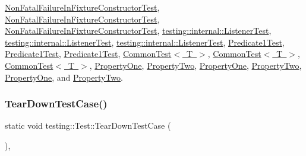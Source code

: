 \mbox{\hyperlink{class_non_fatal_failure_in_fixture_constructor_test_ab76d79c346d9a378d625fde5739e8ad6}{Non\+Fatal\+Failure\+In\+Fixture\+Constructor\+Test}}, \mbox{\hyperlink{class_non_fatal_failure_in_fixture_constructor_test_ad5d87bdc012dc66c008e7891008eb6a8}{Non\+Fatal\+Failure\+In\+Fixture\+Constructor\+Test}}, \mbox{\hyperlink{class_non_fatal_failure_in_fixture_constructor_test_ad5d87bdc012dc66c008e7891008eb6a8}{Non\+Fatal\+Failure\+In\+Fixture\+Constructor\+Test}}, \mbox{\hyperlink{classtesting_1_1internal_1_1_listener_test_a733f61300772e432a6a3ec7837c9f331}{testing\+::internal\+::\+Listener\+Test}}, \mbox{\hyperlink{classtesting_1_1internal_1_1_listener_test_a733f61300772e432a6a3ec7837c9f331}{testing\+::internal\+::\+Listener\+Test}}, \mbox{\hyperlink{classtesting_1_1internal_1_1_listener_test_ad112535025d668e3ea14e71d8741c810}{testing\+::internal\+::\+Listener\+Test}}, \mbox{\hyperlink{class_predicate1_test_aacedc6281afabd551ae2e67777016f3d}{Predicate1\+Test}}, \mbox{\hyperlink{class_predicate1_test_aacedc6281afabd551ae2e67777016f3d}{Predicate1\+Test}}, \mbox{\hyperlink{class_predicate1_test_ad2974af5c6abc508847c3a9912b24a90}{Predicate1\+Test}}, \mbox{\hyperlink{class_common_test_a5e851b64ff1f73cb79b4dbd1d39fd075}{Common\+Test$<$ T $>$}}, \mbox{\hyperlink{class_common_test_a5e851b64ff1f73cb79b4dbd1d39fd075}{Common\+Test$<$ T $>$}}, \mbox{\hyperlink{class_common_test_aeae195c2cefa956c6ae5be1226e6ecd8}{Common\+Test$<$ T $>$}}, \mbox{\hyperlink{class_property_one_a3ed895113848403d5ea27f52a1bb0545}{Property\+One}}, \mbox{\hyperlink{class_property_two_aa4ffb2b9dddeba69f0f9baf133f06ef2}{Property\+Two}}, \mbox{\hyperlink{class_property_one_a0a9a054682c28e32d6b3007e966a1aaf}{Property\+One}}, \mbox{\hyperlink{class_property_two_a8c2b36ef29249c5654f13bf8f504236a}{Property\+Two}}, \mbox{\hyperlink{class_property_one_a0a9a054682c28e32d6b3007e966a1aaf}{Property\+One}}, and \mbox{\hyperlink{class_property_two_a8c2b36ef29249c5654f13bf8f504236a}{Property\+Two}}.

\mbox{\label{classtesting_1_1_test_af374706cbaf0ffc460f4fd04e7c150f1}} 
\subsubsection{\texorpdfstring{TearDownTestCase()}{TearDownTestCase()}\hspace{0.1cm}{\footnotesize\ttfamily [1/3]}}
{\footnotesize\ttfamily static void testing\+::\+Test\+::\+Tear\+Down\+Test\+Case (\begin{DoxyParamCaption}{ }\end{DoxyParamCaption})\hspace{0.3cm}{\ttfamily [inline]}, {\ttfamily [static]}}

